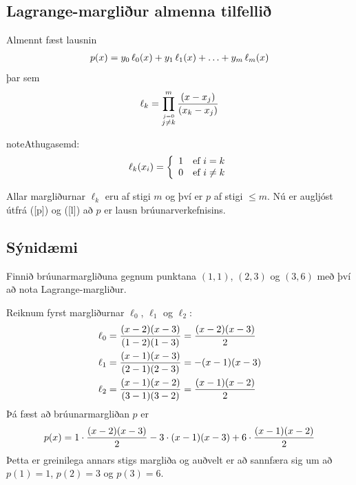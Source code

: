 \documentclass[A4paper,10pt,icelandic]{sphinxmanual}
\begin{document}
\subsection{Lagrange-margliður almenna tilfellið}
\label{kafli03:lagrange-margliur-almenna-tilfelli}
Almennt fæst lausnin
\begin{gather}
\begin{split}\label{p}
  p(x) = y_0 \, \ell_{0}(x) + y_1 \, \ell_{1}(x)
  + \ldots + y_m \, \ell_{m}(x)\end{split}\notag
\end{gather}
þar sem
\begin{gather}
\begin{split}\ell_{k} = \prod\limits_{\stackrel{j=0}{j\not=k}}^m
  \frac{(x-x_j)}{(x_k-x_j)}\end{split}\notag
\end{gather}
\begin{notice}{note}{Athugasemd:}\begin{gather}
\begin{split}\label{l}
  \ell_{k}(x_i) = \left\{ \begin{array}{cc}
      1 & \text{ef } i = k \\
      0 & \text{ef } i \not= k
  \end{array} \right.\end{split}\notag
\end{gather}\end{notice}

Allar margliðurnar \(\ell_{k}\) eru af stigi \(m\) og því er
\(p\) af stigi \(\leq m\). Nú er augljóst útfrá ({[}p{]}) og ({[}l{]})
að \(p\) er lausn brúunarverkefnisins.


\subsection{Sýnidæmi}
\label{kafli03:synidaemi}
Finnið brúunarmargliðuna gegnum punktana \((1,1)\), \((2,3)\)
og \((3,6)\) með því að nota Lagrange-margliður.

Reiknum fyrst margliðurnar \(\ell_{0}\), \(\ell_{1}\) og
\(\ell_{2}\):
\begin{gather}
\begin{split}\begin{aligned}
  \ell_{0} &= \frac{(x-2)(x-3)}{(1-2)(1-3)}
  = \frac{(x-2)(x-3)}{2} \\
  \ell_{1} &= \frac{(x-1)(x-3)}{(2-1)(2-3)}
  = -(x-1)(x-3) \\
  \ell_{2} &= \frac{(x-1)(x-2)}{(3-1)(3-2)}
  = \frac{(x-1)(x-2)}{2}\end{aligned}\end{split}\notag
\end{gather}
Þá fæst að brúunarmargliðan \(p\) er
\begin{gather}
\begin{split}p(x) = 1 \cdot \frac{(x-2)(x-3)}{2}
  - 3 \cdot (x-1)(x-3)
  + 6 \cdot \frac{(x-1)(x-2)}{2}\end{split}\notag
\end{gather}
Þetta er greinilega annars stigs margliða og auðvelt er að sannfæra sig
um að \(p(1) = 1\), \(p(2) = 3\) og \(p(3) = 6\).
\end{document}
